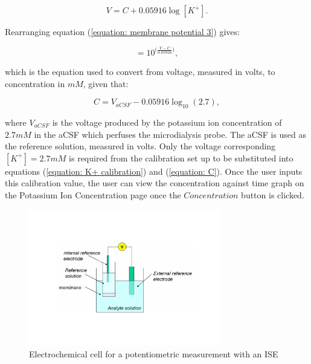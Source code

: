 \begin{equation}
    V = C + 0.05916 \log [K^{+}].
    \label{equation: membrane potential 3}
\end{equation}

\noindent Rearranging equation (\ref{equation: membrane potential 3}) gives:

\begin{equation}
    [K^{+}] = 10^{\big(\frac{V-C}{0.05916}\big)},
    \label{equation: K+ calibration}
\end{equation}

\noindent which is the equation used to convert from voltage, measured in volts, to concentration in $mM$, given that:

\begin{equation}
    C = V_{aCSF} - 0.05916\log_{10} (2.7),
    \label{equation: C}
\end{equation}

\noindent where $V_{aCSF}$ is the voltage produced by the potassium ion concentration of $2.7mM$ in the aCSF which perfuses the microdialysis probe. The aCSF is used as the reference solution, measured in volts. Only the voltage corresponding $[K^{+}] = 2.7mM$ is required from the calibration set up to be substituted into equations (\ref{equation: K+ calibration}) and (\ref{equation: C}). Once the user inputs this calibration value, the user can view the concentration against time graph on the Potassium Ion Concentration page once the $Concentration$ button is clicked. \newline

\begin{figure}[h!]
\centering
\includegraphics[trim={0cm 5cm 0cm  5cm}, clip, width=0.75\textwidth]{./figures/ISE.pdf}
\captionsetup{justification=centering}
\caption{Electrochemical cell for a potentiometric measurement with an ISE \cite{LibreTexts2019}}
\label{fig: ISE}
\end{figure}


